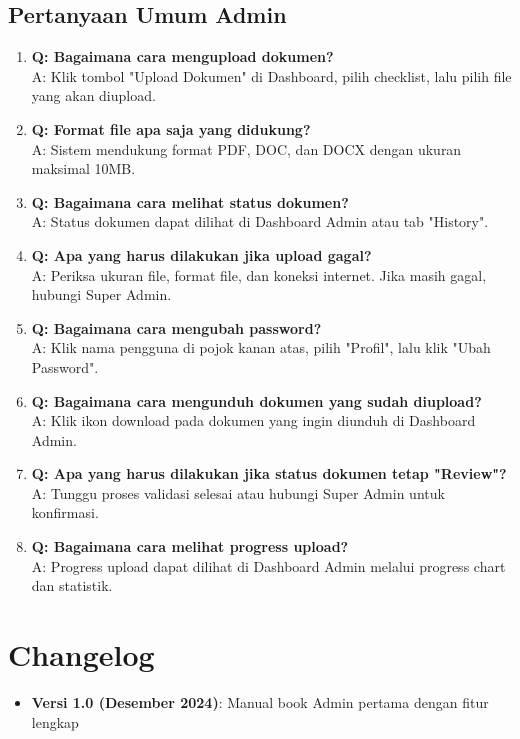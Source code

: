 \documentclass[12pt,a4paper]{article}
\begin{document}
\subsection{Pertanyaan Umum Admin}
\begin{enumerate}
\item \textbf{Q: Bagaimana cara mengupload dokumen?}\\
A: Klik tombol "Upload Dokumen" di Dashboard, pilih checklist, lalu pilih file yang akan diupload.

\item \textbf{Q: Format file apa saja yang didukung?}\\
A: Sistem mendukung format PDF, DOC, dan DOCX dengan ukuran maksimal 10MB.

\item \textbf{Q: Bagaimana cara melihat status dokumen?}\\
A: Status dokumen dapat dilihat di Dashboard Admin atau tab "History".

\item \textbf{Q: Apa yang harus dilakukan jika upload gagal?}\\
A: Periksa ukuran file, format file, dan koneksi internet. Jika masih gagal, hubungi Super Admin.

\item \textbf{Q: Bagaimana cara mengubah password?}\\
A: Klik nama pengguna di pojok kanan atas, pilih "Profil", lalu klik "Ubah Password".

\item \textbf{Q: Bagaimana cara mengunduh dokumen yang sudah diupload?}\\
A: Klik ikon download pada dokumen yang ingin diunduh di Dashboard Admin.

\item \textbf{Q: Apa yang harus dilakukan jika status dokumen tetap "Review"?}\\
A: Tunggu proses validasi selesai atau hubungi Super Admin untuk konfirmasi.

\item \textbf{Q: Bagaimana cara melihat progress upload?}\\
A: Progress upload dapat dilihat di Dashboard Admin melalui progress chart dan statistik.
\end{enumerate}

\section{Changelog}
\begin{itemize}
\item \textbf{Versi 1.0 (Desember 2024)}: Manual book Admin pertama dengan fitur lengkap
\end{itemize}
\end{document}
